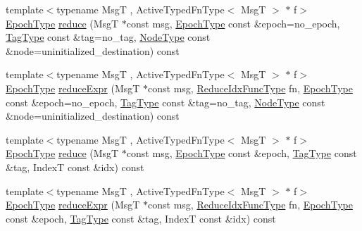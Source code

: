 \begin{DoxyCompactItemize}
\item 
{\footnotesize template$<$typename MsgT , Active\+Typed\+Fn\+Type$<$ Msg\+T $>$ $\ast$ f$>$ }\\\hyperlink{namespacevt_a985a5adf291c34a3ca263b3378388236}{Epoch\+Type} \hyperlink{structvt_1_1vrt_1_1collection_1_1_reducable_a4bf1d380e884ea2568626a6195cba321}{reduce} (MsgT $\ast$const msg, \hyperlink{namespacevt_a985a5adf291c34a3ca263b3378388236}{Epoch\+Type} const \&epoch=no\+\_\+epoch, \hyperlink{namespacevt_a84ab281dae04a52a4b243d6bf62d0e52}{Tag\+Type} const \&tag=no\+\_\+tag, \hyperlink{namespacevt_a866da9d0efc19c0a1ce79e9e492f47e2}{Node\+Type} const \&node=uninitialized\+\_\+destination) const
\item 
{\footnotesize template$<$typename MsgT , Active\+Typed\+Fn\+Type$<$ Msg\+T $>$ $\ast$ f$>$ }\\\hyperlink{namespacevt_a985a5adf291c34a3ca263b3378388236}{Epoch\+Type} \hyperlink{structvt_1_1vrt_1_1collection_1_1_reducable_a431a1840392806c219759867e4d9516e}{reduce\+Expr} (MsgT $\ast$const msg, \hyperlink{structvt_1_1vrt_1_1collection_1_1_reducable_a9f5a6c385efafe1fa52937f4809a9486}{Reduce\+Idx\+Func\+Type} fn, \hyperlink{namespacevt_a985a5adf291c34a3ca263b3378388236}{Epoch\+Type} const \&epoch=no\+\_\+epoch, \hyperlink{namespacevt_a84ab281dae04a52a4b243d6bf62d0e52}{Tag\+Type} const \&tag=no\+\_\+tag, \hyperlink{namespacevt_a866da9d0efc19c0a1ce79e9e492f47e2}{Node\+Type} const \&node=uninitialized\+\_\+destination) const
\item 
{\footnotesize template$<$typename MsgT , Active\+Typed\+Fn\+Type$<$ Msg\+T $>$ $\ast$ f$>$ }\\\hyperlink{namespacevt_a985a5adf291c34a3ca263b3378388236}{Epoch\+Type} \hyperlink{structvt_1_1vrt_1_1collection_1_1_reducable_aac9bcd9f1bf69f13ab7b206580fc6969}{reduce} (MsgT $\ast$const msg, \hyperlink{namespacevt_a985a5adf291c34a3ca263b3378388236}{Epoch\+Type} const \&epoch, \hyperlink{namespacevt_a84ab281dae04a52a4b243d6bf62d0e52}{Tag\+Type} const \&tag, IndexT const \&idx) const
\item 
{\footnotesize template$<$typename MsgT , Active\+Typed\+Fn\+Type$<$ Msg\+T $>$ $\ast$ f$>$ }\\\hyperlink{namespacevt_a985a5adf291c34a3ca263b3378388236}{Epoch\+Type} \hyperlink{structvt_1_1vrt_1_1collection_1_1_reducable_a6f8d457832242aa26bbce67e9d6318a0}{reduce\+Expr} (MsgT $\ast$const msg, \hyperlink{structvt_1_1vrt_1_1collection_1_1_reducable_a9f5a6c385efafe1fa52937f4809a9486}{Reduce\+Idx\+Func\+Type} fn, \hyperlink{namespacevt_a985a5adf291c34a3ca263b3378388236}{Epoch\+Type} const \&epoch, \hyperlink{namespacevt_a84ab281dae04a52a4b243d6bf62d0e52}{Tag\+Type} const \&tag, IndexT const \&idx) const
\end{DoxyCompactItemize}


